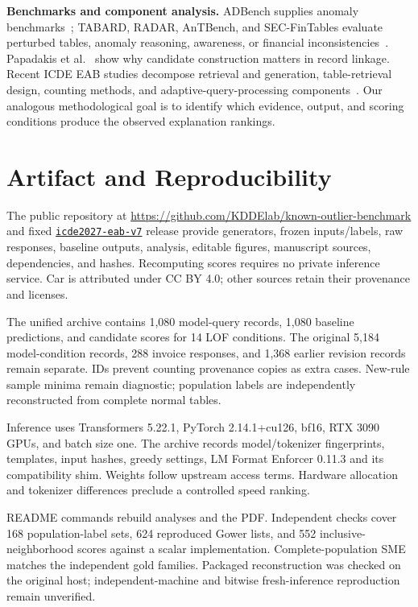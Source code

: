 \documentclass[conference]{IEEEtran}
\begin{document}
\textbf{Benchmarks and component analysis.} ADBench supplies anomaly benchmarks~\cite{han2022adbench}; TABARD, RADAR, AnTBench, and SEC-FinTables evaluate perturbed tables, anomaly reasoning, awareness, or financial inconsistencies~\cite{choudhury2025tabard,gu2025radar,wei2026antbench,ke2026secfintables}. Papadakis et al.~\cite{papadakis2024reevaluation} show why candidate construction matters in record linkage. Recent ICDE EAB studies decompose retrieval and generation, table-retrieval design, counting methods, and adaptive-query-processing components~\cite{zhang2026xrag,yang2026tr360,zhu2026beacon,mu2026aqp}. Our analogous methodological goal is to identify which evidence, output, and scoring conditions produce the observed explanation rankings.

\section{Artifact and Reproducibility}
The public repository at \url{https://github.com/KDDElab/known-outlier-benchmark} and fixed \href{https://github.com/KDDElab/known-outlier-benchmark/releases/tag/icde2027-eab-v7}{\texttt{icde2027-eab-v7}} release provide generators, frozen inputs/labels, raw responses, baseline outputs, analysis, editable figures, manuscript sources, dependencies, and hashes. Recomputing scores requires no private inference service. Car is attributed under CC BY 4.0; other sources retain their provenance and licenses.

The unified archive contains 1,080 model-query records, 1,080 baseline predictions, and candidate scores for 14 LOF conditions. The original 5,184 model-condition records, 288 invoice responses, and 1,368 earlier revision records remain separate. IDs prevent counting provenance copies as extra cases. New-rule sample minima remain diagnostic; population labels are independently reconstructed from complete normal tables.

Inference uses Transformers 5.22.1, PyTorch 2.14.1+cu126, bf16, RTX 3090 GPUs, and batch size one. The archive records model/tokenizer fingerprints, templates, input hashes, greedy settings, LM Format Enforcer 0.11.3 and its compatibility shim. Weights follow upstream access terms. Hardware allocation and tokenizer differences preclude a controlled speed ranking.

README commands rebuild analyses and the PDF. Independent checks cover 168 population-label sets, 624 reproduced Gower lists, and 552 inclusive-neighborhood scores against a scalar implementation. Complete-population SME matches the independent gold families. Packaged reconstruction was checked on the original host; independent-machine and bitwise fresh-inference reproduction remain unverified.
\end{document}
